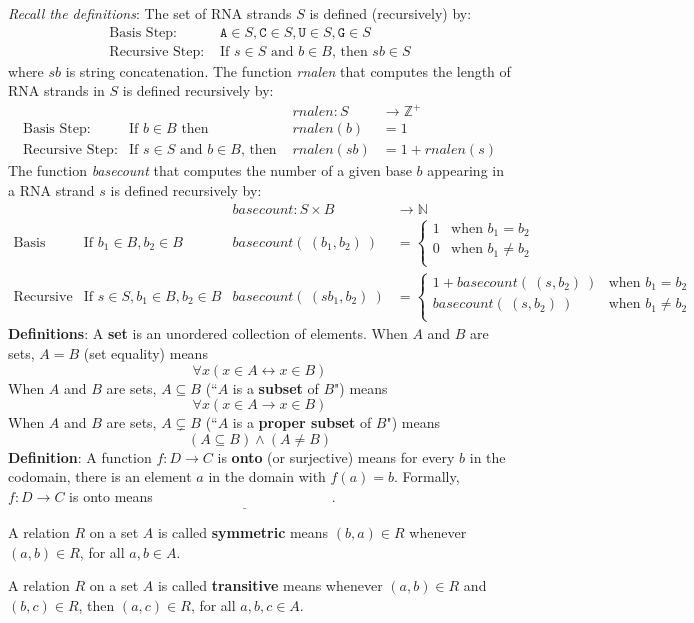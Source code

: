 \documentclass[12pt, oneside]{article}
\newcommand{\A}[0]{\texttt{A}}
\newcommand{\C}[0]{\texttt{C}}
\newcommand{\G}[0]{\texttt{G}}
\newcommand{\U}[0]{\texttt{U}}
\begin{document}
{\it Recall the definitions}: The set of RNA strands $S$ is defined (recursively) by:
\[
\begin{array}{ll}
\textrm{Basis Step: } & \A \in S, \C \in S, \U \in S, \G \in S \\
\textrm{Recursive Step: } & \textrm{If } s \in S\textrm{ and }b \in B \textrm{, then }sb \in S
\end{array}
\]
where $sb$ is string concatenation.
The function \textit{rnalen} that computes the length of RNA strands in $S$ is defined recursively by:
\[
\begin{array}{llll}
& & \textit{rnalen} : S & \to \mathbb{Z}^+ \\
\textrm{Basis Step:} & \textrm{If } b \in B\textrm{ then } & \textit{rnalen}(b) & = 1 \\
\textrm{Recursive Step:} & \textrm{If } s \in S\textrm{ and }b \in B\textrm{, then  } & \textit{rnalen}(sb) & = 1 + \textit{rnalen}(s)
\end{array}
\]
The function \textit{basecount} that computes the number of a given base 
$b$ appearing in a RNA strand $s$ is defined recursively by:
\[
\begin{array}{llll}
& & \textit{basecount} : S \times B & \to \mathbb{N} \\
\textrm{Basis Step:} &  \textrm{If } b_1 \in B, b_2 \in B & \textit{basecount}(~(b_1, b_2)~) & =
        \begin{cases}
            1 & \textrm{when } b_1 = b_2 \\
            0 & \textrm{when } b_1 \neq b_2 \\
        \end{cases} \\
\textrm{Recursive Step:} & \textrm{If } s \in S, b_1 \in B, b_2 \in B &\textit{basecount}(~(s b_1, b_2)~) & =
        \begin{cases}
            1 + \textit{basecount}(~(s, b_2)~) & \textrm{when } b_1 = b_2 \\
            \textit{basecount}(~(s, b_2)~) & \textrm{when } b_1 \neq b_2 \\
        \end{cases}
\end{array}
\]
{\bf Definitions}:
A {\bf set} is an  unordered collection of  elements.
When $A$ and  $B$ are sets,  $A = B$ (set equality) means  
\[
    \forall x  ( x\in A \leftrightarrow x \in B)
\]
When $A$ and  $B$ are sets, $A \subseteq B$ (``$A$ is a {\bf subset} of $B$") means 
\[
    \forall x  (x \in A  \to x  \in B)
\]
When $A$ and  $B$ are sets,  $A \subsetneq B$ (``$A$ is a {\bf proper subset} of $B$") means 
\[
    (A\subseteq B) \wedge  (A \neq B)
\]
{\bf Definition}: A function $f: D  \to C$ is {\bf onto} (or  surjective) means for every $b$ in the codomain, 
there  is an element $a$ in the domain with  $f(a) = b$.
Formally, $f: D  \to  C$ is  onto  means $\underline{\phantom{\forall b \in C  \exists a \in D ( f(a) = b)}}$.

A relation $R$ on a set $A$ is called {\bf symmetric} means 
$(b, a) \in R$ whenever $(a, b) \in R$, for all $a, b \in A$. 

A relation $R$ on a set $A$ is called {\bf transitive} means 
whenever $(a, b) \in R$ and $(b, c) \in R$, then $(a, c) \in R$, for all $a, b, c \in A$.
\end{document}
